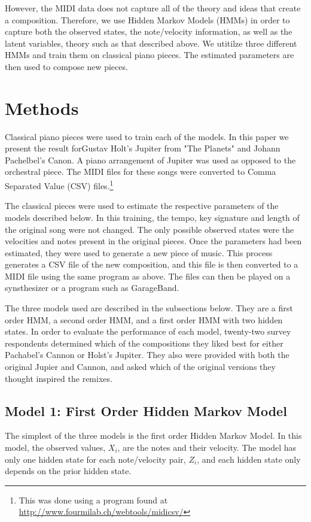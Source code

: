 \documentclass{article} %
\begin{document}
However, the MIDI data does not capture all of the theory and ideas that create a composition. Therefore, we use Hidden Markov Models (HMMs) in order to capture both the observed states, the note/velocity information, as well as the latent variables, theory such as that described above. We utitilze three different HMMs and train them on classical piano pieces. The estimated parameters are then used to compose new pieces.


\section{Methods}

Classical piano pieces were used to train each of the models. In this paper we present the result forGustav Holt's Jupiter from "The Planets" and Johann Pachelbel's Canon. A piano arrangement of Jupiter was used as opposed to the orchestral piece. The MIDI files for these songs were converted to Comma Separated Value (CSV) files.\footnote{This was done using a program found at \url{http://www.fourmilab.ch/webtools/midicsv/}} 

The classical pieces were used to estimate the respective parameters of the models described below. In this training, the tempo, key signature and length of the original song were not changed. The only possible observed states were the velocities and notes present in the original pieces. Once the parameters had been estimated, they were used to generate a new piece of music. This process generates a CSV file of the new composition, and this file is then converted to a MIDI file using the same program as above. The files can then be played on a synsthesizer or a program such as GarageBand.

The three models used are described in the subsections below. They are a first order HMM, a second order HMM, and a first order HMM with two hidden states. In order to evaluate the performance of each model, twenty-two survey respondents determined which of the compositions they liked best for either Pachabel's Cannon or Holst's Jupiter. They also were provided with both the original Jupier and Cannon, and asked which of the original versions they thought inspired the remixes. 

\subsection {Model 1: First Order Hidden Markov Model}

The simplest of the three models is the first order Hidden Markov Model. In this model, the observed values, $X_i$, are the notes and their velocity. The model has only one hidden state for each note/velocity pair, $Z_i$, and each hidden state only depends on the prior hidden state. 
\end{document}
